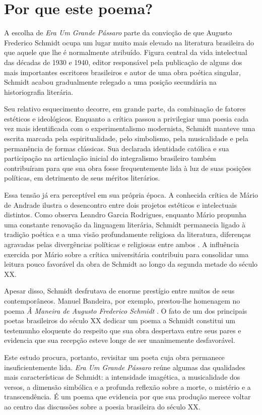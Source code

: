 \section{Por que este poema?}

A escolha de \textit{Era Um Grande Pássaro} parte da convicção de que Augusto
Frederico Schmidt ocupa um lugar muito mais elevado na literatura brasileira do
que aquele que lhe é normalmente atribuído. Figura central da vida intelectual
das décadas de 1930 e 1940, editor responsável pela publicação de alguns dos
mais importantes escritores brasileiros e autor de uma obra poética singular,
Schmidt acabou gradualmente relegado a uma posição secundária na historiografia
literária.

Seu relativo esquecimento decorre, em grande parte, da combinação de fatores
estéticos e ideológicos. Enquanto a crítica passou a privilegiar uma poesia
cada vez mais identificada com o experimentalismo modernista, Schmidt manteve
uma escrita marcada pela espiritualidade, pelo simbolismo, pela musicalidade e
pela permanência de formas clássicas. Sua declarada identidade católica e sua
participação na articulação inicial do integralismo brasileiro também
contribuíram para que sua obra fosse frequentemente lida à luz de suas posições
políticas, em detrimento de seus méritos literários.

Essa tensão já era perceptível em sua própria época. A conhecida crítica de
Mário de Andrade ilustra o desencontro entre dois projetos estéticos e
intelectuais distintos. Como observa Leandro Garcia Rodrigues, enquanto Mário
propunha uma constante renovação da linguagem literária, Schmidt permanecia
ligado à tradição poética e a uma visão profundamente religiosa da literatura,
diferenças agravadas pelas divergências políticas e religiosas entre ambos
\cite{rodrigues2018}. A influência exercida por Mário sobre a crítica
universitária contribuiu para consolidar uma leitura pouco favorável da obra de
Schmidt ao longo da segunda metade do século XX.

Apesar disso, Schmidt desfrutava de enorme prestígio entre muitos de seus
contemporâneos. Manuel Bandeira, por exemplo, prestou-lhe homenagem no poema
\textit{À Maneira de Augusto Frederico Schmidt}
\cite[p.~111]{bandeira1955mafua}. O fato de um dos principais poetas
brasileiros do século XX dedicar um poema a Schmidt constitui um testemunho
eloquente do respeito que sua obra despertava entre seus pares e evidencia que
sua recepção esteve longe de ser unanimemente
desfavorável.

Este estudo procura, portanto, revisitar um poeta cuja obra permanece
insuficientemente lida. \textit{Era Um Grande Pássaro} reúne algumas das
qualidades mais características de Schmidt: a intensidade imagética, a
musicalidade dos versos, a dimensão simbólica e a profunda reflexão sobre a
morte, o mistério e a transcendência. É um poema que evidencia por que sua
produção merece voltar ao centro das discussões sobre a poesia brasileira do
século XX.
